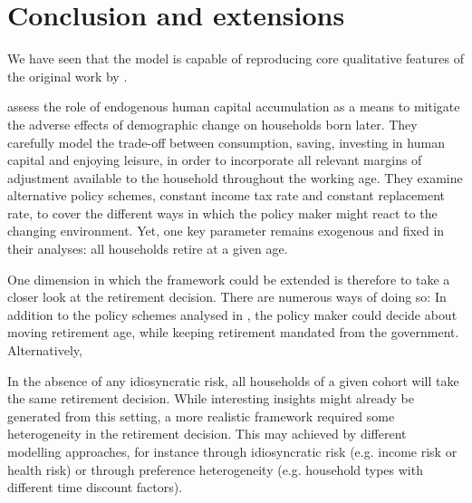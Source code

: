 \section{Conclusion and extensions}
\label{sec:conclusion}

We have seen that the model is capable of reproducing core qualitative features of the original work by \citet{LudwigSchelkleVogel2012}.

\Cite{LudwigSchelkleVogel2012} assess the role of endogenous human capital accumulation as a means to mitigate the adverse effects of demographic change on households born later. They carefully model the trade-off between consumption, saving, investing in human capital and enjoying leisure, in order to incorporate all relevant margins of adjustment available to the household throughout the working age. They examine alternative policy schemes, constant income tax rate and constant replacement rate, to cover the different ways in which the policy maker might react to the changing environment. Yet, one key parameter remains exogenous and fixed in their analyses: all households retire at a given age.

One dimension in which the framework could be extended is therefore to take a closer look at the retirement decision. There are numerous ways of doing so: In addition to the policy schemes analysed in \cite{LudwigSchelkleVogel2012}, the policy maker could decide about moving retirement age, while keeping retirement mandated from the government. Alternatively,

In the absence of any idiosyncratic risk, all households of a given cohort will take the same retirement decision. While interesting insights might already be generated from this setting, a more realistic framework required some heterogeneity in the retirement decision. This may achieved by different modelling approaches, for instance through idiosyncratic risk (e.g. income risk or health risk) or through preference heterogeneity (e.g. household types with different time discount factors).

